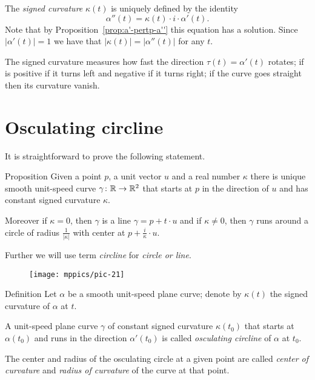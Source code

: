 The \emph{signed curvature} $\kappa(t)$ is uniquely defined by
the identity 
\[\alpha''(t)=\kappa(t)\cdot i\cdot \alpha'(t).\]
Note that by Proposition~\ref{prop:a'-pertp-a''} this equation has a solution.
Since $|\alpha'(t)|=1$ we have that $|\kappa(t)|=|\alpha''(t)|$ for any $t$.

The signed curvature measures how fast the direction $\tau(t)=\alpha'(t)$ rotates;
if is positive if it turns left and negative if it turns right;
if the curve goes straight then its curvature vanish.

\section{Osculating circline}

It is straightforward to prove the following statement.

\begin{thm}{Proposition}\label{prop:circline}
Given a point $p$,
a unit vector $u$ 
and a real number $\kappa$ there is unique smooth unit-speed curve $\gamma\colon\mathbb{R}\to\mathbb{R}^2$ 
that starts at $p$ in the direction of $u$ and has constant signed curvature $\kappa$.

Moreover if $\kappa=0$, then $\gamma$ is a line $\gamma=p+t\cdot u$
and if $\kappa\ne 0$, then $\gamma$ runs around a circle of radius $\tfrac1{|\kappa|}$ with center at $p+\tfrac i\kappa\cdot u$. 
\end{thm}

Further we will use term \emph{circline} for \emph{circle or line}.

{

\begin{wrapfigure}{r}{30 mm}
\vskip-4mm
\centering
\texttt{[image: mppics/pic-21]}
\vskip0mm
\end{wrapfigure}

\begin{thm}{Definition}
Let $\alpha$ be a smooth unit-speed plane curve;
denote by $\kappa(t)$ the signed curvature of $\alpha$ at $t$.

A unit-speed plane curve $\gamma$ of constant signed curvature $\kappa(t_0)$ that starts at $\alpha(t_0)$ and runs in the direction $\alpha'(t_0)$ is called \emph{osculating circline} of $\alpha$ at $t_0$.
\end{thm}

}

The center and radius of the osculating circle at a given point are called \emph{center of curvature} and \emph{radius of curvature} of the curve at that point.

